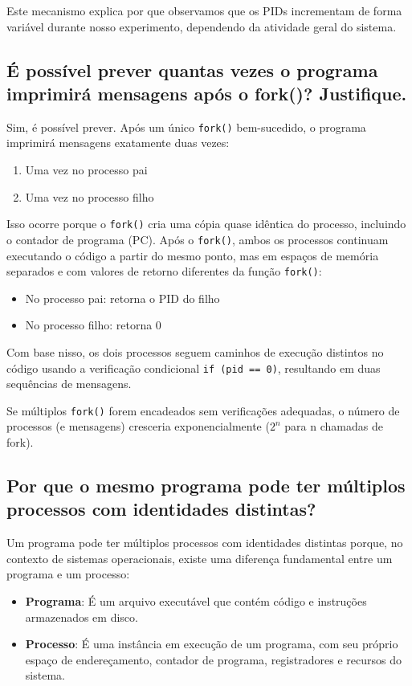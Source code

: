 \documentclass[a4paper,11pt]{article}
\begin{document}
Este mecanismo explica por que observamos que os PIDs incrementam de forma variável durante nosso experimento, dependendo da atividade geral do sistema.

\subsection{É possível prever quantas vezes o programa imprimirá mensagens após o fork()? Justifique.}

Sim, é possível prever. Após um único \texttt{fork()} bem-sucedido, o programa imprimirá mensagens exatamente duas vezes:

\begin{enumerate}
    \item Uma vez no processo pai
    \item Uma vez no processo filho
\end{enumerate}

Isso ocorre porque o \texttt{fork()} cria uma cópia quase idêntica do processo, incluindo o contador de programa (PC). Após o \texttt{fork()}, ambos os processos continuam executando o código a partir do mesmo ponto, mas em espaços de memória separados e com valores de retorno diferentes da função \texttt{fork()}:
\begin{itemize}
    \item No processo pai: retorna o PID do filho
    \item No processo filho: retorna 0
\end{itemize}

Com base nisso, os dois processos seguem caminhos de execução distintos no código usando a verificação condicional \texttt{if (pid == 0)}, resultando em duas sequências de mensagens.

Se múltiplos \texttt{fork()} forem encadeados sem verificações adequadas, o número de processos (e mensagens) cresceria exponencialmente ($2^n$ para n chamadas de fork).

\subsection{Por que o mesmo programa pode ter múltiplos processos com identidades distintas?}

Um programa pode ter múltiplos processos com identidades distintas porque, no contexto de sistemas operacionais, existe uma diferença fundamental entre um programa e um processo:

\begin{itemize}
    \item \textbf{Programa}: É um arquivo executável que contém código e instruções armazenados em disco.
    \item \textbf{Processo}: É uma instância em execução de um programa, com seu próprio espaço de endereçamento, contador de programa, registradores e recursos do sistema.
\end{itemize}
\end{document}
